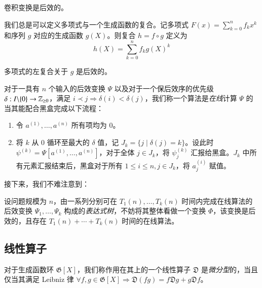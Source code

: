 \begin{lemma}
卷积变换是后效的。
\end{lemma}

\begin{definition} [多项式左复合]
我们总是可以定义多项式与一个生成函数的复合。记多项式 $F(x) = \sum_{k=0}^n f_k x^k$ 和序列 $g$ 对应的生成函数 $g(X)$。则复合 $h = f \circ g$ 定义为
$$
h(X) = \sum_{k=0}^n f_k g(X)^k
$$
\end{definition}

\begin{lemma}
多项式的左复合关于 $g$ 是后效的。
\end{lemma}

\begin{definition} [在线算法] \label{relaxedalgo}
对于一具有 $n$ 个输入的后效变换 $\Psi$ 以及对于一个保后效序的优先级 $\delta: {I \backslash \{0\}} \rightarrow \mathbb Z_{\ge 0}$，满足 $i \prec j \Rightarrow \delta(i) < \delta(j)$，我们称一个算法是\emph{在线}计算 $\Psi$ 的当其能配合黑盒完成以下流程：
\begin{enumerate}
\item 令 $a^{(1)}, \dots, a^{(n)}$ 所有项均为 $0$。

\item 将 $k$ 从 $0$ 循环至最大的 $\delta$ 值，记 $J_k = \{ j \mid \delta(j) = k \}$。设此时 $\psi^{(k)} = \Psi[a^{(1)}, \dots, a^{(n)}]$，对于全体 $j\in J_k$，将 $\psi^{(k)}_j$ 汇报给黑盒。$J_k$ 中所有元素汇报结束后，黑盒对于所有 $1\le i\le n, j\in J_k$，将 $a^{(i)}_j$ 赋值。
\end{enumerate}
\end{definition}

接下来，我们不难注意到：

\begin{lemma}
设问题规模为 $n$，由一系列分别可在 $T_1(n),\dots,T_k(n)$ 时间内完成在线算法的后效变换 $\Psi_1,\dots, \Psi_k$ 构成的\emph{表达式树}，不妨将其整体看做一个变换 $\Phi$，该变换是后效的，且存在 $T_1(n) + \cdots + T_k(n)$ 时间的在线算法。
\end{lemma}

\subsection{线性算子}

\begin{definition}[微分型算子]
对于生成函数环 $\mathfrak G[X]$，我们称作用在其上的一个线性算子 $\mathfrak D$ 是\emph{微分型}的，当且仅当其满足 Leibniz 律 $\forall f,g\in \mathfrak G[X] \Rightarrow \mathfrak D(fg) = f\mathfrak D g+g\mathfrak D f$。
\end{definition}

